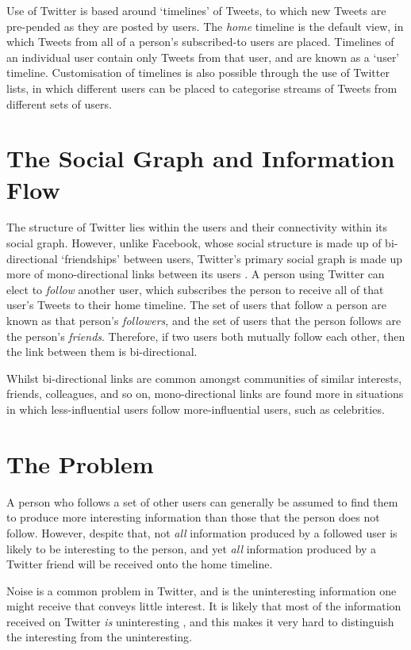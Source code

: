 Use of Twitter is based around `timelines' of Tweets, to which new Tweets are pre-pended as they are posted by users. The \textit{home} timeline is the default view, in which Tweets from all of a person's subscribed-to users are placed. Timelines of an individual user contain only Tweets from that user, and are known as a `user' timeline. Customisation of timelines is also possible through the use of Twitter lists, in which different users can be placed to categorise streams of Tweets from different sets of users.


\section{The Social Graph and Information Flow}
The structure of Twitter lies within the users and their connectivity within its social graph. However, unlike Facebook, whose social structure is made up of bi-directional `friendships' between users, Twitter's primary social graph is made up more of mono-directional links between its users \cite{edwards13}. A person using Twitter can elect to \textit{follow} another user, which subscribes the person to receive all of that user's Tweets to their home timeline. The set of users that follow a person are known as that person's \textit{followers}, and the set of users that the person follows are the person's \textit{friends}. Therefore, if two users both mutually follow each other, then the link between them is bi-directional.

Whilst bi-directional links are common amongst communities of similar interests, friends, colleagues, and so on, mono-directional links are found more in situations in which less-influential users follow more-influential users, such as celebrities.


\section{The Problem}
A person who follows a set of other users can generally be assumed to find them to produce more interesting information than those that the person does not follow. However, despite that, not \textit{all} information produced by a followed user is likely to be interesting to the person, and yet \textit{all} information produced by a Twitter friend will be received onto the home timeline.

Noise is a common problem in Twitter, and is the uninteresting information one might receive that conveys little interest. It is likely that most of the information received on Twitter \textit{is} uninteresting \cite{alonso10}, and this makes it very hard to distinguish the interesting from the uninteresting.

